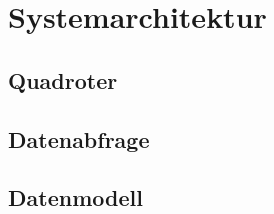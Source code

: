 \section{Systemarchitektur}

\subsection{Quadroter}

\subsection{Datenabfrage}
\subsection{Datenmodell}
